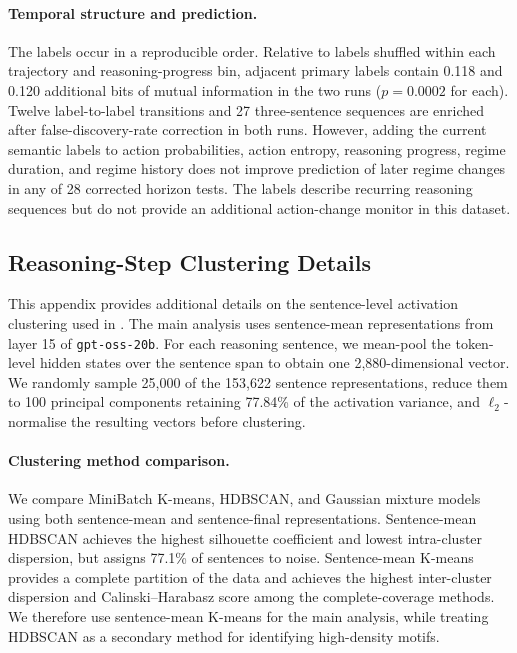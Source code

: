 \documentclass{article}
\begin{document}
\paragraph{Temporal structure and prediction.}
The labels occur in a reproducible order. Relative to labels shuffled within
each trajectory and reasoning-progress bin, adjacent primary labels contain
0.118 and 0.120 additional bits of mutual information in the two runs
($p=0.0002$ for each). Twelve
label-to-label transitions and 27 three-sentence sequences are enriched after
false-discovery-rate correction in both runs. However, adding the current
semantic labels to action probabilities, action entropy, reasoning progress,
regime duration, and regime history does not improve prediction of later
regime changes in any of 28 corrected horizon tests. The labels describe
recurring reasoning sequences but do not provide an additional action-change
monitor in this dataset.



\subsection{Reasoning-Step Clustering Details}
\label{app:reasoning-clustering}

This appendix provides additional details on the sentence-level activation
clustering used in . The main analysis uses
sentence-mean representations from layer 15 of \texttt{gpt-oss-20b}. For
each reasoning sentence, we mean-pool the token-level hidden states over the
sentence span to obtain one 2,880-dimensional vector. We randomly sample
25,000 of the 153,622 sentence representations, reduce them to 100 principal
components retaining 77.84\% of the activation variance, and
$\ell_2$-normalise the resulting vectors before clustering.

\paragraph{Clustering method comparison.}
We compare MiniBatch K-means, HDBSCAN, and Gaussian mixture models using both
sentence-mean and sentence-final representations. Sentence-mean HDBSCAN
achieves the highest silhouette coefficient and lowest intra-cluster
dispersion, but assigns 77.1\% of sentences to noise. Sentence-mean K-means
provides a complete partition of the data and achieves the highest
inter-cluster dispersion and Calinski--Harabasz score among the
complete-coverage methods. We therefore use sentence-mean K-means for the
main analysis, while treating HDBSCAN as a secondary method for identifying
high-density motifs.
\end{document}
